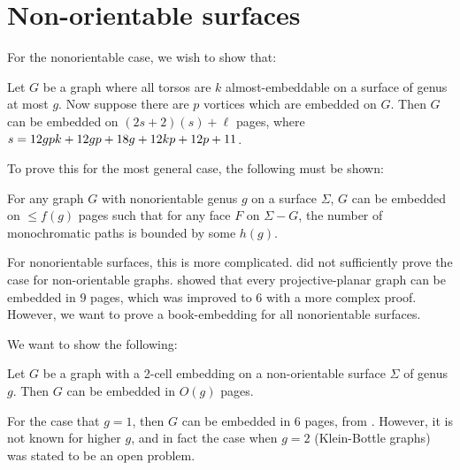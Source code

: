 \section{Non-orientable surfaces}

For the nonorientable case, we wish to show that:

\begin{theorem}\label{thm:orientablevortices}
	Let $G$ be a graph where all torsos are $k$ almost-embeddable on a surface of genus at most $g$.  Now suppose there are $p$ vortices which are embedded on $G$. Then $G$ can be embedded on $(2s + 2)(s) + \ell$ pages, where $s = 12gpk + 12gp + 18g + 12kp + 12p + 11$. 
\end{theorem}

To prove this for the most general case, the following must be shown:

\begin{conjecture}
	For any graph $G$ with nonorientable genus $g$ on a surface $\Sigma$, $G$ can be embedded on $\leq f(g)$ pages such that for any face $F$ on $\Sigma - G$, the number of monochromatic paths is bounded by some $h(g)$. 
\end{conjecture}

For nonorientable surfaces, this is more complicated. \textcite{heathEmbeddingPlanarGraphs1984} did not sufficiently prove the case for non-orientable graphs. \textcite{nakamotoBookEmbeddingProjectiveplanar2015} showed that every projective-planar graph can be embedded in $9$ pages, which was improved to 6 with a more complex proof. However, we want to prove a book-embedding for all nonorientable surfaces. 

We want to show the following:
\begin{conjecture}
	Let $G$ be a graph with a 2-cell embedding on a non-orientable surface $\Sigma$ of genus $g$. Then $G$ can be embedded in $O(g)$ pages.
\end{conjecture}

For the case that $g = 1$, then $G$ can be embedded in 6 pages, from \textcite{ozekiBookEmbeddingGraphs2019}. However, it is not known for higher $g$, and in fact the case when $g = 2$ (Klein-Bottle graphs) was stated to be an open problem. 
